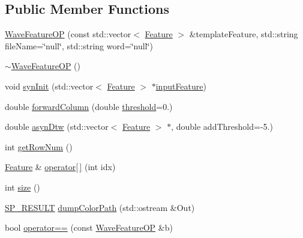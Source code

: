 \subsection*{Public Member Functions}
\begin{DoxyCompactItemize}
\item 
\hyperlink{class_wave_feature_o_p_a706b21be0839ad0693d98a39aa1be7f0}{Wave\+Feature\+O\+P} (const std\+::vector$<$ \hyperlink{class_feature}{Feature} $>$ \&template\+Feature, std\+::string file\+Name=\char`\"{}null\char`\"{}, std\+::string word=\char`\"{}null\char`\"{})
\item 
\hyperlink{class_wave_feature_o_p_ad046b3e250106abe16d9125a029bedc2}{$\sim$\+Wave\+Feature\+O\+P} ()
\item 
void \hyperlink{class_wave_feature_o_p_a39443a329cc706eaceefb28c598b297f}{syn\+Init} (std\+::vector$<$ \hyperlink{class_feature}{Feature} $>$ $\ast$\hyperlink{class_wave_feature_o_p_a2e67fe9dc06889453b70fe6efa19554f}{input\+Feature})
\item 
double \hyperlink{class_wave_feature_o_p_aa71ceac341c47742cb1ebe09bda1294a}{forward\+Column} (double \hyperlink{rawdtw_8cpp_afcfbedec6ebde62c6a091ce335836ef1}{threshold}=0.)
\item 
double \hyperlink{class_wave_feature_o_p_a3a8dd15d19899586e5953886c7ee6de4}{asyn\+Dtw} (std\+::vector$<$ \hyperlink{class_feature}{Feature} $>$ $\ast$, double add\+Threshold=-\/5.)
\item 
int \hyperlink{class_wave_feature_o_p_a44bed4fe2d42a232cd9f3e9d812ad240}{get\+Row\+Num} ()
\item 
\hyperlink{class_feature}{Feature} \& \hyperlink{class_wave_feature_o_p_a6a165bd04bb4f29e9b408981cca66328}{operator\mbox{[}$\,$\mbox{]}} (int idx)
\item 
int \hyperlink{class_wave_feature_o_p_a039099d115a4fa490ddb3296441a81e0}{size} ()
\item 
\hyperlink{tool_8h_ab71a1f2fb85a32402ced5c483105b38e}{S\+P\+\_\+\+R\+E\+S\+U\+L\+T} \hyperlink{class_wave_feature_o_p_aed6ce75f665daf168b5782672f89096a}{dump\+Color\+Path} (std\+::ostream \&Out)
\item 
bool \hyperlink{class_wave_feature_o_p_a124a8caab52ea00e1cf0165aa1d071c9}{operator==} (const \hyperlink{class_wave_feature_o_p}{Wave\+Feature\+O\+P} \&b)
\end{DoxyCompactItemize}
